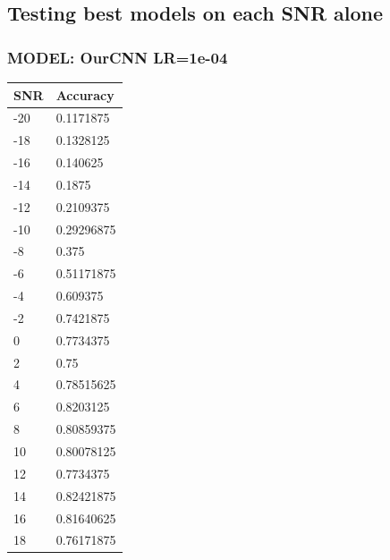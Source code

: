 \documentclass[12pt,a4paper]{article}
\begin{document}
    \subsection{Testing best models on each SNR alone}
    \subsubsection{MODEL: OurCNN LR=1e-04}
    \begin{table}[!ht]
    \raggedright
    \begin{tabular}{|l|l|}
    \hline
        SNR & Accuracy \\ \hline
        -20 & 0.1171875 \\ \hline
        -18 & 0.1328125 \\ \hline
        -16 & 0.140625 \\ \hline
        -14 & 0.1875 \\ \hline
        -12 & 0.2109375 \\ \hline
        -10 & 0.29296875 \\ \hline
        -8 & 0.375 \\ \hline
        -6 & 0.51171875 \\ \hline
        -4 & 0.609375 \\ \hline
        -2 & 0.7421875 \\ \hline
        0 & 0.7734375 \\ \hline
        2 & 0.75 \\ \hline
        4 & 0.78515625 \\ \hline
        6 & 0.8203125 \\ \hline
        8 & 0.80859375 \\ \hline
        10 & 0.80078125 \\ \hline
        12 & 0.7734375 \\ \hline
        14 & 0.82421875 \\ \hline
        16 & 0.81640625 \\ \hline
        18 & 0.76171875 \\ \hline
    \end{tabular}
\end{table}
    \newpage
\end{document}

